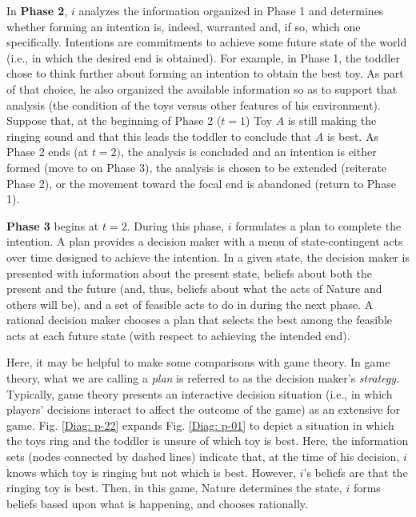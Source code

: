 \documentclass[
11pt,
titlepage,
reqno,
]{article}%
\theoremstyle{definition}
\begin{document}
In \textbf{Phase 2}, $i$ analyzes the information organized in Phase 1 and determines whether forming an intention is, indeed, warranted and, if so, which one specifically. Intentions are commitments to achieve some future state of the world (i.e., in which the desired end is obtained). For example, in Phase 1, the toddler chose to think further about forming an intention to obtain the best toy. As part of that choice, he also organized the available information so as to support that analysis (the condition of the toys versus other features of his environment). Suppose that, at the beginning of Phase 2 ($t=1$) Toy $A$ is still making the ringing sound and that this leads the toddler to conclude that $A$ is best. As Phase 2 ends (at $t=2)$, the analysis is concluded and an intention is either formed (move to on Phase 3), the analysis is chosen to be extended (reiterate Phase 2), or the movement toward the focal end is abandoned (return to Phase 1). 

\textbf{Phase 3} begins at $t=2$. During this phase, $i$ formulates a plan to complete the intention. A plan provides a decision maker with  a menu of state-contingent acts over time designed to achieve the intention. In a given state, the decision maker is presented with information about the present state, beliefs about both the present and the future (and, thus, beliefs about what the acts of Nature and others will be), and a set of feasible acts to do in during the next phase. A rational decision maker chooses a plan that selects the best among the feasible acts at each future state (with respect to achieving the intended end).

Here, it may be helpful to make some comparisons with game theory. In game theory, what we are calling a \textit{plan} is referred to as the decision maker's \textit{strategy}. Typically, game theory presents an interactive decision situation (i.e., in which players' decisions interact to affect the outcome of the game) as an extensive for game. Fig. \ref{Diag: p-22} expands Fig. \ref{Diag: p-01} to depict a situation in which the toys ring and the toddler is unsure of which toy is best. Here, the information sets (nodes connected by dashed lines) indicate that, at the time of his decision, $i$ knows which toy is ringing but not which is best. However, $i$'s beliefs are that the ringing toy is best. Then, in this game, Nature determines the state, $i$ forms beliefs based upon what is happening, and chooses rationally. 
\end{document}
